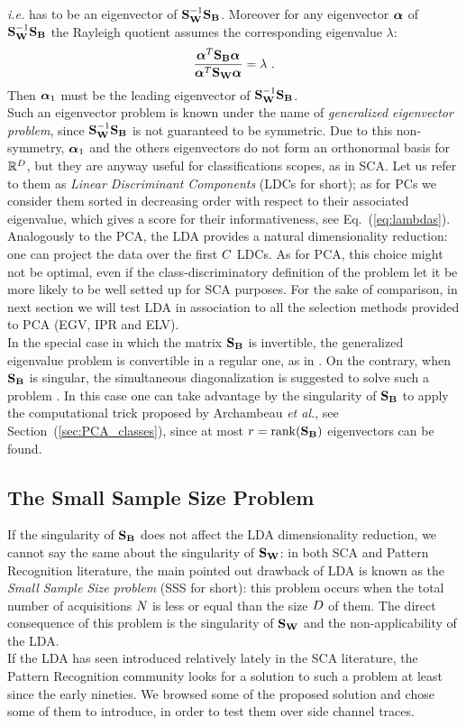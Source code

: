 \textit{i.e.} has to be an eigenvector of $\SW^{-1} \SB$. Moreover for any eigenvector $\AAlpha$ of $\SW^{-1}\SB$ the Rayleigh quotient assumes the corresponding eigenvalue $\lambda$:
\begin{equation}\label{eq:lambdas}
\frac{\AAlpha^T \SB \AAlpha}{\AAlpha^T \SW \AAlpha} = \lambda \mbox{ .}
\end{equation}
Then $\AAlpha_1$ must be the leading eigenvector of $\SW^{-1} \SB$.\\
Such an eigenvector problem is known under the name of {\em generalized eigenvector problem}, since $\SW^{-1} \SB$ is not guaranteed to be symmetric. Due to this non-symmetry,  $\AAlpha_1$ and the others eigenvectors do not form an orthonormal basis for $\mathbb{R}^\traceLength$, but they are anyway useful for classifications scopes, as in SCA. Let us refer to them as {\em Linear Discriminant Components} (LDCs for short); as for PCs we consider them sorted in decreasing order with respect to their associated eigenvalue, which gives a score for their informativeness, see Eq.~(\ref{eq:lambdas}). Analogously to the PCA, the LDA provides a natural dimensionality reduction: one can project the data over the first $\newTraceLength$ LDCs. As for PCA, this choice might not be optimal, even if the class-discriminatory definition of the problem let it be more likely to be well setted up for SCA purposes. For the sake of comparison, in next section we will test LDA in association to all the selection methods provided to PCA (EGV, IPR and ELV).\\
In the special case in which the matrix $\SB$ is invertible, the generalized eigenvalue problem is convertible in a regular one, as in \cite{Standaert2008}. On the contrary, when $\SB$ is singular, the simultaneous diagonalization is suggested to solve such a problem \cite{Fukunaga}. In this case one can take advantage by the singularity of $\SB$ to apply the computational trick proposed by Archambeau \textit{et al.}, see Section~(\ref{sec:PCA_classes}), since at most $r = \mathrm{rank}(\SB)$ eigenvectors can be found.\\


\subsection{The Small Sample Size Problem}
If the singularity of $\SB$ does not affect the LDA dimensionality reduction, we cannot say the same about the singularity of $\SW$: in both SCA and Pattern Recognition literature, the main pointed out drawback of LDA is known as the {\em Small Sample Size problem} (SSS for short): this problem occurs when the total number of acquisitions $\numTraces[]$ is less or equal than the size $\traceLength$ of them. The direct consequence of this problem is the singularity of $\SW$ and the non-applicability of the LDA.\\
If the LDA has seen introduced relatively lately in the SCA literature, the Pattern Recognition community looks for a solution to such a problem at least since the early nineties. We browsed some of the proposed solution and chose some of them to introduce, in order to test them over side channel traces.

